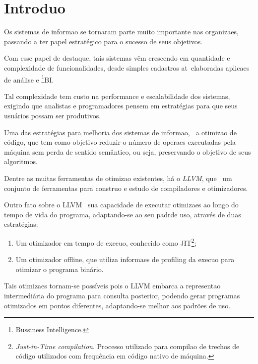 
\chapter{Introdu\ca o}
\label{er:introducao}


Os sistemas de informa\ca o se tornaram parte muito importante nas organiza\co es, passando a ter papel estrat\'egico para o sucesso de seus objetivos.

Com esse papel de destaque, tais sistemas v\^em crescendo em quantidade e complexidade de funcionalidades, desde simples cadastros at\eh\ elaboradas aplica\co es de an\'alise e \footnote{Bussiness Intelligence.}{BI}.

Tal complexidade tem custo na performance e escalabilidade dos sistemas, exigindo que analistas e programadores pensem em estrat\'egias para que seus usu\'arios possam ser produtivos.

Uma das estrat\'egias para melhoria dos sistemas de informa\ca o, \eh\ a otimiza\ca o de c\'odigo, que tem como objetivo reduzir o n\'umero de opera\co es executadas pela m\'aquina sem perda de sentido sem\^antico, ou seja, preservando o objetivo de seus algoritmos.

Dentre as muitas ferramentas de otimiza\ca o existentes, h\'a o \textit{LLVM}, que \eh\ um conjunto de ferramentas para constru\ca o e estudo de compiladores e otimizadores.

Outro fato sobre o LLVM \eh\ sua capacidade de executar otimiza\co es ao longo do tempo de vida do programa, adaptando-se ao seu padr\ao de uso, atrav\'es de duas estrat\'egias:

\begin{enumerate}
\item Um otimizador em tempo de execu\ca o, conhecido como JIT\footnote{\textit{Just-in-Time compilation}. Processo utilizado para compila\ca o de trechos de c\'odigo utilizados com frequ\^encia em c\'odigo nativo de m\'aquina.};
\item Um otimizador offline, que utiliza informa\co es de profiling da execu\ca o para otimizar o programa bin\'ario.
\end{enumerate}

Tais otimiza\co es tornam-se poss\'iveis pois o LLVM embarca a representa\ca o intermedi\'aria do programa para consulta posterior, podendo gerar programas otimizados em pontos diferentes, adaptando-se melhor aos padr\~oes de uso.

